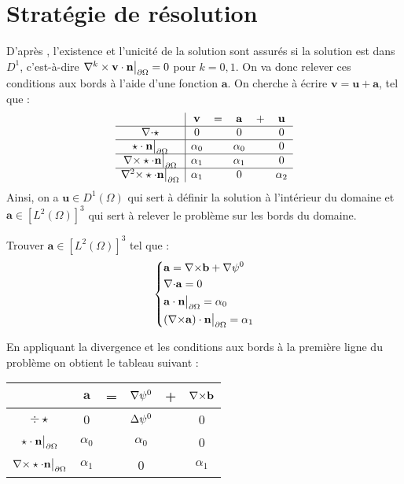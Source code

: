 \chapter{Stratégie de résolution}
\label{strat}
D'après \cite{Penel2004}, l'existence et l'unicité de la solution sont assurés si la solution est dans $D^1$, c'est-à-dire $\nabla^k\times\mathbf{v}\cdot\mathbf{n}{\big\rvert_{\partial\Omega}}=0$ pour $k=0,1$. On va donc relever ces conditions aux bords à l'aide d'une fonction $\mathbf{a}$. On cherche à écrire  $\mathbf{v}=\mathbf{u}+\mathbf{a}$, tel que :\\
\begin{equation}\label{v}
\begin{array}{c|ccccc}
& \mathbf{v} & = & \mathbf{a} & + & \mathbf{u}\\ \hline
{\nabla\cdot}\star & 0 & & 0 & & 0\\ \hline
\star\cdot \mathbf{n}{\big\rvert_{\partial\Omega}} & \alpha_0 & & \alpha_0 & & 0\\ \hline
{\nabla\times}\star\cdot \mathbf{n}{\big\rvert_{\partial\Omega}} & \alpha_1 & & \alpha_1 & & 0\\ \hline
{\nabla^2\times}\star\cdot \mathbf{n}{\big\rvert_{\partial\Omega}} & \alpha_1 & & 0 & & \alpha_2
\end{array}
\end{equation}
Ainsi, on a $\mathbf{u}\in D^1(\Omega)$ qui sert à définir la solution à l'intérieur du domaine et $\mathbf{a}\in [L^2(\Omega)]^3$ qui sert à relever le problème sur les bords du domaine.
\begin{pb}\label{a}
Trouver $\mathbf{a}\in [L^2(\Omega)]^3$ tel que :
\begin{equation*}
\left\{\begin{aligned}
&\mathbf{a}={\nabla\times} \mathbf{b}+{\nabla}\psi^0\\
&{\nabla\cdot} \mathbf{a} =0\\
&\mathbf{a}\cdot \mathbf{n}{\big\rvert_{\partial\Omega}} = \alpha_0\\
&({\nabla\times} \mathbf{a})\cdot \mathbf{n}{\big\rvert_{\partial\Omega}} = \alpha_1
\end{aligned}\right.
\end{equation*}
\end{pb}
En appliquant la divergence et les conditions aux bords à la première ligne du problème on obtient le tableau suivant :
\begin{center}
\begin{tabular}{c|ccccc}
& $\mathbf{a}$ & = & ${\nabla}\psi^0$ & + & ${\nabla\times} \mathbf{b}$ \\ \hline
$\div\star$ & 0 & & ${\Delta}\psi^0$ & & 0\\ \hline
$\star\cdot \mathbf{n}{\big\rvert_{\partial\Omega}}$ & $\alpha_0$ & & $\alpha_0$ & & 0\\ \hline
${\nabla\times}\star\cdot \mathbf{n}{\big\rvert_{\partial\Omega}}$ & $\alpha_1$ & & 0 & & $\alpha_1$
\end{tabular}
\end{center}
